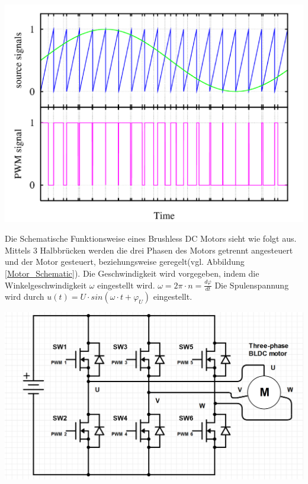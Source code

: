 \documentclass[10pt,a4paper,oneside,abstracton]{scrartcl}
\newenvironment{Figure}
  {\par\medskip\noindent\minipage{\linewidth}}
  {\endminipage\par\medskip}
\begin{document}
\begin{multicols}{2}
\begin{Figure}
	\includegraphics[width=\textwidth]{Bilder/BLDC_Aussteuerung.png}
	\label{Aussteuerung}
\end{Figure}

\noindent
Die Schematische Funktionsweise eines Brushless DC Motors sieht wie folgt aus. 
Mittels 3 Halbbrücken werden die drei Phasen des Motors getrennt angesteuert und der Motor gesteuert, 
beziehungsweise geregelt(vgl. Abbildung \ref*{Motor_Schematic}). 
Die Geschwindigkeit wird vorgegeben, indem die Winkelgeschwindigkeit $ \omega $ eingestellt wird. 
 $ \omega = 2\pi \cdot n = \frac{d\varphi}{dt} $   
 \newline
Die Spulenspannung wird durch $ u(t) = U \cdot sin(\omega \cdot t + \varphi_U) $ eingestellt. 
\begin{Figure}
	\includegraphics[width=\textwidth]{Bilder/BLDC_Schematic.png}
	\label{Motor_Schematic}
\end{Figure}


\end{multicols}
\end{document}
